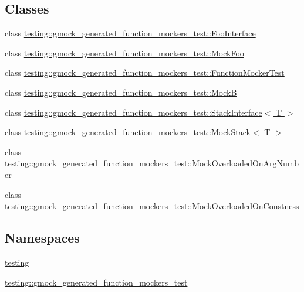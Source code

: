 \subsection*{Classes}
\begin{DoxyCompactItemize}
\item 
class \hyperlink{classtesting_1_1gmock__generated__function__mockers__test_1_1FooInterface}{testing\+::gmock\+\_\+generated\+\_\+function\+\_\+mockers\+\_\+test\+::\+Foo\+Interface}
\item 
class \hyperlink{classtesting_1_1gmock__generated__function__mockers__test_1_1MockFoo}{testing\+::gmock\+\_\+generated\+\_\+function\+\_\+mockers\+\_\+test\+::\+Mock\+Foo}
\item 
class \hyperlink{classtesting_1_1gmock__generated__function__mockers__test_1_1FunctionMockerTest}{testing\+::gmock\+\_\+generated\+\_\+function\+\_\+mockers\+\_\+test\+::\+Function\+Mocker\+Test}
\item 
class \hyperlink{classtesting_1_1gmock__generated__function__mockers__test_1_1MockB}{testing\+::gmock\+\_\+generated\+\_\+function\+\_\+mockers\+\_\+test\+::\+MockB}
\item 
class \hyperlink{classtesting_1_1gmock__generated__function__mockers__test_1_1StackInterface}{testing\+::gmock\+\_\+generated\+\_\+function\+\_\+mockers\+\_\+test\+::\+Stack\+Interface$<$ T $>$}
\item 
class \hyperlink{classtesting_1_1gmock__generated__function__mockers__test_1_1MockStack}{testing\+::gmock\+\_\+generated\+\_\+function\+\_\+mockers\+\_\+test\+::\+Mock\+Stack$<$ T $>$}
\item 
class \hyperlink{classtesting_1_1gmock__generated__function__mockers__test_1_1MockOverloadedOnArgNumber}{testing\+::gmock\+\_\+generated\+\_\+function\+\_\+mockers\+\_\+test\+::\+Mock\+Overloaded\+On\+Arg\+Number}
\item 
class \hyperlink{classtesting_1_1gmock__generated__function__mockers__test_1_1MockOverloadedOnConstness}{testing\+::gmock\+\_\+generated\+\_\+function\+\_\+mockers\+\_\+test\+::\+Mock\+Overloaded\+On\+Constness}
\end{DoxyCompactItemize}
\subsection*{Namespaces}
\begin{DoxyCompactItemize}
\item 
 \hyperlink{namespacetesting}{testing}
\item 
 \hyperlink{namespacetesting_1_1gmock__generated__function__mockers__test}{testing\+::gmock\+\_\+generated\+\_\+function\+\_\+mockers\+\_\+test}
\end{DoxyCompactItemize}
